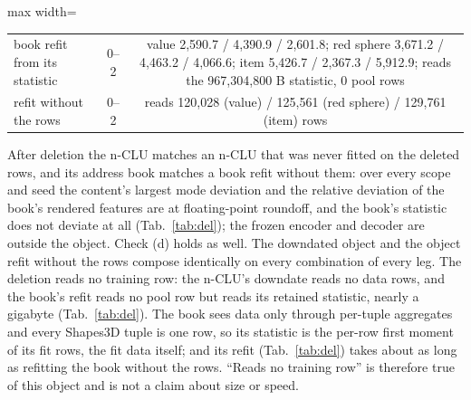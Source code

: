 \documentclass{article} %
\begin{document}
\begin{table}[t]
\begin{adjustbox}{max width=\linewidth}
\begin{tabular}{lccccccc}
book refit from its statistic & 0--2 & \multicolumn{6}{p{10.6cm}}{value 2,590.7 / 4,390.9 / 2,601.8; red sphere 3,671.2 / 4,463.2 / 4,066.6; item 5,426.7 / 2,367.3 / 5,912.9; reads the 967,304,800 B statistic, 0 pool rows} \\
refit without the rows & 0--2 & \multicolumn{6}{p{10.6cm}}{reads 120,028 (value) / 125,561 (red sphere) / 129,761 (item) rows} \\
\bottomrule
\end{tabular}\end{adjustbox}
\end{table}

\noindent After deletion the n-CLU matches an n-CLU that was never fitted on the deleted rows, and its address
book matches a book refit without them: over every scope and seed the content's largest mode
deviation and the relative deviation of the book's rendered features are at floating-point roundoff, and the book's statistic does not deviate
at all (Tab.~\ref{tab:del}); the frozen encoder and decoder are outside the object. Check (d)
holds as well. The downdated object and the object refit without the rows compose identically on every
combination of every leg.
 The deletion reads no training row: the n-CLU's downdate reads no data rows, and the %
book's refit reads no pool row but reads its retained statistic, nearly a gigabyte (Tab.~\ref{tab:del}). The book sees %
data only through per-tuple aggregates and every Shapes3D tuple is one row, so its statistic is the
per-row first moment of its fit rows, the fit data itself; and its refit (Tab.~\ref{tab:del}) takes %
about as long as refitting the book without the rows. ``Reads no training row'' is %
therefore true of this object and is not a claim about size or speed.
\end{document}
